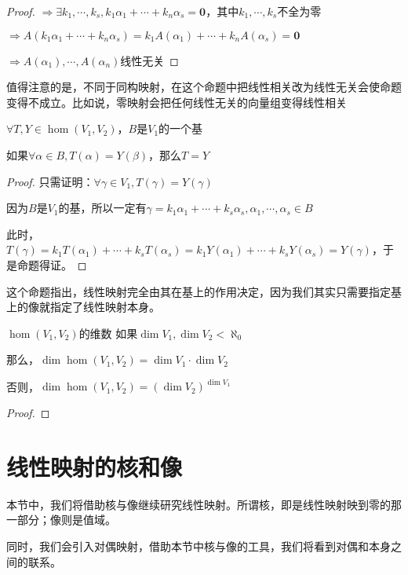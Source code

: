 \documentclass[12pt, a4paper, oneside, UTF8]{ctexbook}
\begin{document}
\begin{para}{0}
\begin{proof}
						$\Rightarrow \exists k_1,\cdots,k_s,k_1\alpha_1+\cdots+k_n\alpha_s=\mathbf{0}$，其中$k_1,\cdots,k_s$不全为零

						$\Rightarrow A(k_1\alpha_1+\cdots+k_n\alpha_s)=k_1A(\alpha_1)+\cdots+k_nA(\alpha_s)=\mathbf{0}$

						$\Rightarrow A(\alpha_1),\cdots,A(\alpha_n)$线性无关
					\end{proof}
					值得注意的是，不同于同构映射，在这个命题中把线性相关改为线性无关会使命题变得不成立。比如说，零映射会把任何线性无关的向量组变得线性相关
				\point{}
					\begin{proposition}
						$\forall T,Y \in \hom(V_1,V_2)$，$B$是$V_1$的一个基

						如果$\forall \alpha \in B,T(\alpha )=Y(\beta )$，那么$T=Y$
					\end{proposition}
					\begin{proof}
						只需证明：$\forall \gamma \in V_1,T(\gamma )=Y(\gamma )$

						因为$B$是$V_1$的基，所以一定有$\gamma =k_1 \alpha_1+\cdots+k_s \alpha_s,\alpha_1,\cdots,\alpha_s \in B$

						此时，$T(\gamma )=k_1 T(\alpha_1)+\cdots+ k_s T(\alpha_s)=k_1 Y(\alpha_1)+\cdots+ k_s Y(\alpha_s)=Y(\gamma )$，于是命题得证。
					\end{proof}
					这个命题指出，线性映射完全由其在基上的作用决定，因为我们其实只需要指定基上的像就指定了线性映射本身。
				\point{}
					\begin{them}{$\hom(V_1,V_2)$的维数}{}
						如果$\dim V_1,\dim V_2 < \aleph_0$

						那么，$\dim \hom(V_1,V_2) = \dim V_1 \cdot \dim V_2$

						否则，$\dim \hom(V_1,V_2) = (\dim V_2)^{\dim V_1}$
					\end{them}
					\begin{proof}
						
					\end{proof}
			\end{para}
	\section{线性映射的核和像}
		本节中，我们将借助核与像继续研究线性映射。所谓核，即是线性映射映到零的那一部分；像则是值域。

		同时，我们会引入对偶映射，借助本节中核与像的工具，我们将看到对偶和本身之间的联系。
\end{document}
